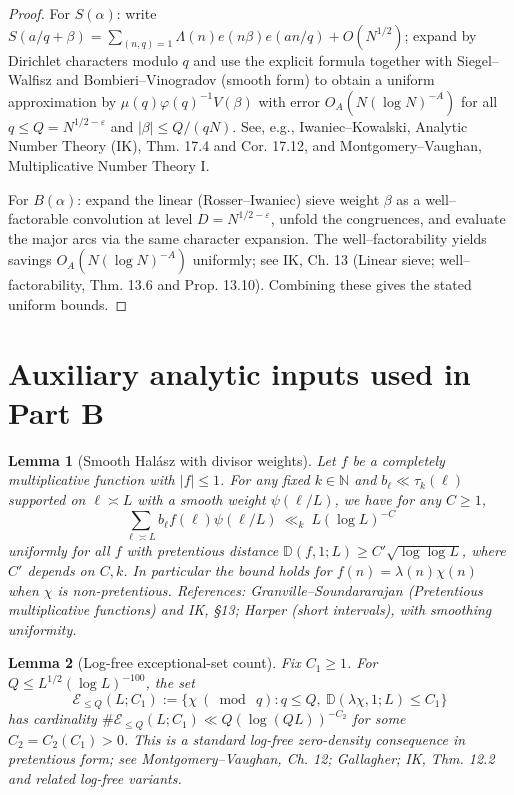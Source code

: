 \documentclass[11pt]{article}
\newtheorem{lemma}{Lemma}[part]
\theoremstyle{definition}
\theoremstyle{remark}
\numberwithin{equation}{part}
\begin{document}
\begin{proof}
	For $S(\alpha)$: write $S(a/q+\beta)=\sum_{(n,q)=1}\Lambda(n)e(n\beta)e(an/q)+O(N^{1/2})$; expand by Dirichlet characters modulo $q$ and use the explicit formula together with Siegel--Walfisz and Bombieri--Vinogradov (smooth form) to obtain a uniform approximation by $\mu(q)\varphi(q)^{-1}V(\beta)$ with error $O_A(N(\log N)^{-A})$ for all $q\le Q=N^{1/2-\varepsilon}$ and $|\beta|\le Q/(qN)$. See, e.g., Iwaniec--Kowalski, Analytic Number Theory (IK), Thm. 17.4 and Cor. 17.12, and Montgomery--Vaughan, Multiplicative Number Theory I.

	For $B(\alpha)$: expand the linear (Rosser--Iwaniec) sieve weight $\beta$ as a well--factorable convolution at level $D=N^{1/2-\varepsilon}$, unfold the congruences, and evaluate the major arcs via the same character expansion. The well--factorability yields savings $O_A(N(\log N)^{-A})$ uniformly; see IK, Ch. 13 (Linear sieve; well--factorability, Thm. 13.6 and Prop. 13.10). Combining these gives the stated uniform bounds.
\end{proof}

\section{Auxiliary analytic inputs used in Part B}

\begin{lemma}[Smooth Hal\'asz with divisor weights]\label{lem:halasz-smooth}
	Let $f$ be a completely multiplicative function with $|f|\le 1$. For any fixed $k\in\mathbb N$ and $b_\ell\ll \tau_k(\ell)$ supported on $\ell\asymp L$ with a smooth weight $\psi(\ell/L)$, we have for any $C\ge 1$,
	\[
		\sum_{\ell\asymp L} b_\ell f(\ell)\psi(\ell/L)\ \ll_{k}\ L(\log L)^{-C}
	\]
	uniformly for all $f$ with pretentious distance $\mathbb D(f,1;L)\ge C'\sqrt{\log\log L}$, where $C'$ depends on $C,k$. In particular the bound holds for $f(n)=\lambda(n)\chi(n)$ when $\chi$ is non-pretentious. References: Granville--Soundararajan (Pretentious multiplicative functions) and IK, \S13; Harper (short intervals), with smoothing uniformity.
\end{lemma}

\begin{lemma}[Log-free exceptional-set count]\label{lem:logfree-density}
	Fix $C_1\ge 1$. For $Q\le L^{1/2}(\log L)^{-100}$, the set
	\[
		\mathcal E_{\le Q}(L;C_1):=\{\chi\ (\bmod\ q): q\le Q,\ \mathbb D(\lambda\chi,1;L)\le C_1\}
	\]
	has cardinality $\#\mathcal E_{\le Q}(L;C_1)\ll Q(\log (QL))^{-C_2}$ for some $C_2=C_2(C_1)>0$. This is a standard log-free zero-density consequence in pretentious form; see Montgomery--Vaughan, Ch. 12; Gallagher; IK, Thm. 12.2 and related log-free variants.
\end{lemma}
\end{document}
